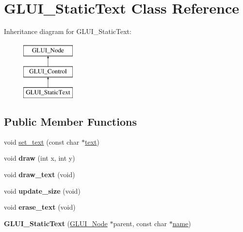 \hypertarget{classGLUI__StaticText}{\section{G\-L\-U\-I\-\_\-\-Static\-Text Class Reference}
\label{classGLUI__StaticText}
}
Inheritance diagram for G\-L\-U\-I\-\_\-\-Static\-Text\-:\begin{figure}[H]
\begin{center}
\leavevmode
\includegraphics[height=3.000000cm]{classGLUI__StaticText}
\end{center}
\end{figure}
\subsection*{Public Member Functions}
\begin{DoxyCompactItemize}
\item 
void \hyperlink{classGLUI__StaticText_a2105e6f3f6061ccfaca8a24b2f984291}{set\-\_\-text} (const char $\ast$\hyperlink{classGLUI__Control_af0d60e9736f4dbc34e9a536e75876d72}{text})
\item 
\hypertarget{classGLUI__StaticText_a2d92dfeb76e42682dbb69f26fc903194}{void {\bfseries draw} (int x, int y)}\label{classGLUI__StaticText_a2d92dfeb76e42682dbb69f26fc903194}

\item 
\hypertarget{classGLUI__StaticText_ab29d8982750fe76f607b18bcc00febdf}{void {\bfseries draw\-\_\-text} (void)}\label{classGLUI__StaticText_ab29d8982750fe76f607b18bcc00febdf}

\item 
\hypertarget{classGLUI__StaticText_ab244674e811501594eca5ea312a30bdd}{void {\bfseries update\-\_\-size} (void)}\label{classGLUI__StaticText_ab244674e811501594eca5ea312a30bdd}

\item 
\hypertarget{classGLUI__StaticText_ae7d5da0264d0b04a46bfb8c27e441b58}{void {\bfseries erase\-\_\-text} (void)}\label{classGLUI__StaticText_ae7d5da0264d0b04a46bfb8c27e441b58}

\item 
\hypertarget{classGLUI__StaticText_a47e7c2daa86db06eed1dea62b0ac091c}{{\bfseries G\-L\-U\-I\-\_\-\-Static\-Text} (\hyperlink{classGLUI__Node}{G\-L\-U\-I\-\_\-\-Node} $\ast$parent, const char $\ast$\hyperlink{classGLUI__Control_aa95b97d50df45335fc33f0af03958eb3}{name})}\label{classGLUI__StaticText_a47e7c2daa86db06eed1dea62b0ac091c}

\end{DoxyCompactItemize}
